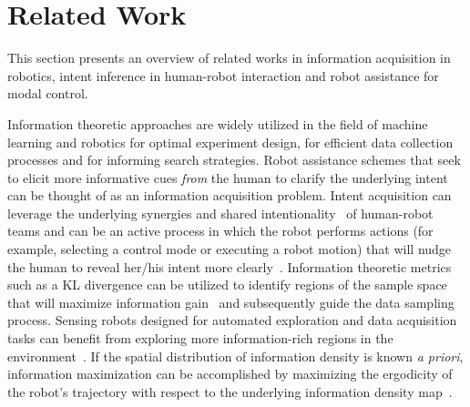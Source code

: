\documentclass[conference]{IEEEtran}
\begin{document}
\section{Related Work}\label{sec:related_work}
This section presents an overview of related works in information acquisition in robotics, intent inference in human-robot interaction and robot assistance for modal control. 
%

Information theoretic approaches are widely utilized in the field of machine learning and robotics for optimal experiment design, for efficient data collection processes and for informing search strategies. Robot assistance schemes that seek to elicit more informative cues \textit{from} the human to clarify the underlying intent can be thought of as an information acquisition problem. Intent acquisition can leverage the underlying synergies and shared intentionality~\citep{tomasello2007shared} of human-robot teams and can be an active process in which the robot performs actions (for example, selecting a control mode or executing a robot motion) that will nudge the human to reveal her/his intent more clearly~\cite{sadigh2016information, sadigh2016planning}. Information theoretic metrics such as a KL divergence can be utilized to identify regions of the sample space that will maximize information gain~\citep{tong2001active} and subsequently guide the data sampling process. Sensing robots designed for automated exploration and data acquisition tasks can benefit from exploring more information-rich regions in the environment~\citep{atanasov2014information}. If the spatial distribution of information density is known \textit{a priori}, information maximization can be accomplished by maximizing the ergodicity of the robot's trajectory with respect to the underlying information density map~\citep{miller2013trajectory, miller2016ergodic}. 
\end{document}
